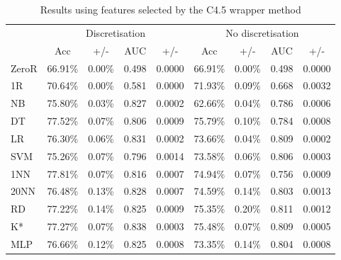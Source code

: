\begin{table}[htbp]
\caption{Results using features selected by the C4.5 wrapper method}
\begin{tabular}{|l|cccc|cccc|}
\hline
 & \multicolumn{ 4}{c|}{Discretisation} & \multicolumn{ 4}{c|}{No discretisation} \\ 
  & Acc & +/- & AUC & +/- & Acc & +/- & AUC & +/- \\ \hline
ZeroR & 66.91\% & 0.00\% & 0.498 & 0.0000 & 66.91\% & 0.00\% & 0.498 & 0.0000 \\ 
1R & 70.64\% & 0.00\% & 0.581 & 0.0000 & 71.93\% & 0.09\% & 0.668 & 0.0032 \\ 
NB & 75.80\% & 0.03\% & 0.827 & 0.0002 & 62.66\% & 0.04\% & 0.786 & 0.0006 \\ 
DT & 77.52\% & 0.07\% & 0.806 & 0.0009 & 75.79\% & 0.10\% & 0.784 & 0.0008 \\ 
LR & 76.30\% & 0.06\% & 0.831 & 0.0002 & 73.66\% & 0.04\% & 0.809 & 0.0002 \\ 
SVM & 75.26\% & 0.07\% & 0.796 & 0.0014 & 73.58\% & 0.06\% & 0.806 & 0.0003 \\ 
1NN & 77.81\% & 0.07\% & 0.816 & 0.0007 & 74.94\% & 0.07\% & 0.756 & 0.0009 \\ 
20NN & 76.48\% & 0.13\% & 0.828 & 0.0007 & 74.59\% & 0.14\% & 0.803 & 0.0013 \\ 
RD & 77.22\% & 0.14\% & 0.825 & 0.0009 & 75.35\% & 0.20\% & 0.811 & 0.0012 \\ 
K* & 77.27\% & 0.07\% & 0.838 & 0.0003 & 75.48\% & 0.07\% & 0.809 & 0.0005 \\ 
MLP & 76.66\% & 0.12\% & 0.825 & 0.0008 & 73.35\% & 0.14\% & 0.804 & 0.0008 \\ \hline
\end{tabular}
\label{}
\end{table}
